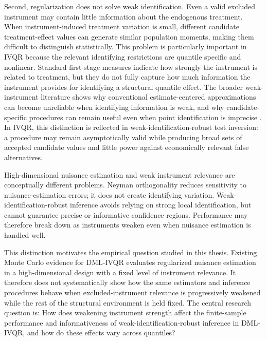 Second, regularization does not solve weak identification. Even a valid excluded instrument may contain little information about the endogenous treatment. When instrument-induced treatment variation is small, different candidate treatment-effect values can generate similar population moments, making them difficult to distinguish statistically. This problem is particularly important in IVQR because the relevant identifying restrictions are quantile specific and nonlinear. Standard first-stage measures indicate how strongly the instrument is related to treatment, but they do not fully capture how much information the instrument provides for identifying a structural quantile effect. The broader weak-instrument literature shows why conventional estimate-centered approximations can become unreliable when identifying information is weak, and why candidate-specific procedures can remain useful even when point identification is imprecise \parencite{staiger_stock_1997,stock_wright_2000,andrews_stock_sun_2019}. In IVQR, this distinction is reflected in weak-identification-robust test inversion: a procedure may remain asymptotically valid while producing broad sets of accepted candidate values and little power against economically relevant false alternatives.

High-dimensional nuisance estimation and weak instrument relevance are conceptually different problems. Neyman orthogonality reduces sensitivity to nuisance-estimation errors; it does not create identifying variation. Weak-identification-robust inference avoids relying on strong local identification, but cannot guarantee precise or informative confidence regions. Performance may therefore break down as instruments weaken even when nuisance estimation is handled well.

This distinction motivates the empirical question studied in this thesis. Existing Monte Carlo evidence for DML-IVQR evaluates regularized nuisance estimation in a high-dimensional design with a fixed level of instrument relevance. It therefore does not systematically show how the same estimators and inference procedures behave when excluded-instrument relevance is progressively weakened while the rest of the structural environment is held fixed. The central research question is: How does weakening instrument strength affect the finite-sample performance and informativeness of weak-identification-robust inference in DML-IVQR, and how do these effects vary across quantiles?

